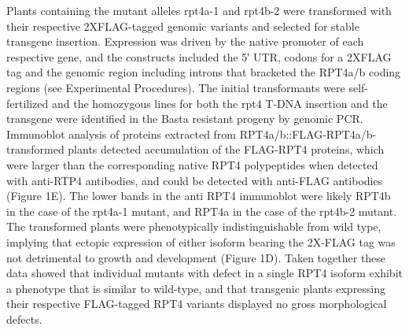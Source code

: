	Plants containing the mutant alleles rpt4a-1 and rpt4b-2 were transformed with their respective 2XFLAG-tagged genomic variants and selected for stable transgene insertion. Expression was driven by the native promoter of each respective gene, and the constructs included the 5′ UTR, codons for a 2XFLAG tag and the genomic region including introns that bracketed the RPT4a/b coding regions (see Experimental Procedures). The initial transformants were self-fertilized and the homozygous lines for both the rpt4 T-DNA insertion and the transgene were identified in the Basta resistant progeny by genomic PCR.  Immunoblot analysis of proteins extracted from RPT4a/b::FLAG-RPT4a/b-transformed plants detected accumulation of the FLAG-RPT4 proteins, which were larger than the corresponding native RPT4 polypeptides when detected with anti-RTP4 antibodies, and could be detected with anti-FLAG antibodies (Figure 1E).  The lower bands in the anti RPT4 immunoblot were likely RPT4b in the case of the rpt4a-1 mutant, and RPT4a in the case of the rpt4b-2 mutant. The transformed plants were phenotypically indistinguishable from wild type, implying that ectopic expression of either isoform bearing the 2X-FLAG tag was not detrimental to growth and development (Figure 1D).  Taken together these data showed that individual mutants with defect in a single RPT4 isoform exhibit a phenotype that is similar to wild-type, and that transgenic plants expressing their respective FLAG-tagged RPT4 variants displayed no gross morphological defects.

